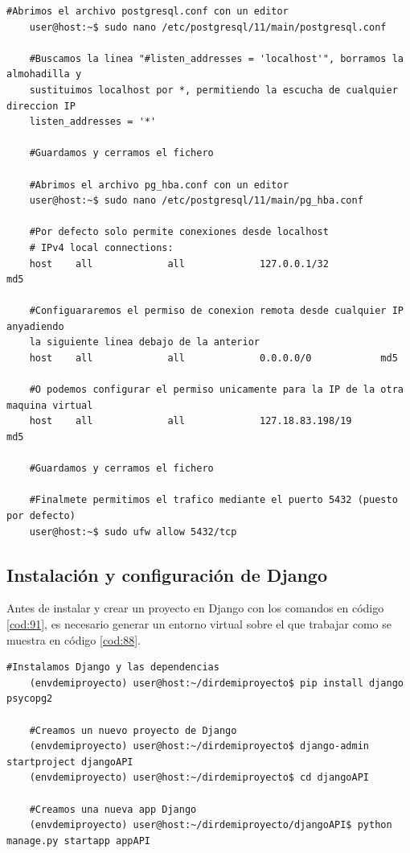 \begin{lstlisting}[caption={Instrucciones por consola y editor de texto para permitir la conexión remota en PostGreSQL}, label=cod:90]
	#Abrimos el archivo postgresql.conf con un editor
	user@host:~$ sudo nano /etc/postgresql/11/main/postgresql.conf
	
	#Buscamos la linea "#listen_addresses = 'localhost'", borramos la almohadilla y
	sustituimos localhost por *, permitiendo la escucha de cualquier direccion IP
	listen_addresses = '*'
	
	#Guardamos y cerramos el fichero
	
	#Abrimos el archivo pg_hba.conf con un editor
	user@host:~$ sudo nano /etc/postgresql/11/main/pg_hba.conf
	
	#Por defecto solo permite conexiones desde localhost
	# IPv4 local connections: 
	host    all             all             127.0.0.1/32            md5 
	
	#Configuararemos el permiso de conexion remota desde cualquier IP anyadiendo
	la siguiente linea debajo de la anterior
	host    all             all             0.0.0.0/0            md5 
	
	#O podemos configurar el permiso unicamente para la IP de la otra maquina virtual
	host    all             all             127.18.83.198/19            md5 
	
	#Guardamos y cerramos el fichero
	
	#Finalmete permitimos el trafico mediante el puerto 5432 (puesto por defecto)
	user@host:~$ sudo ufw allow 5432/tcp
\end{lstlisting}

\subsection{Instalación y configuración de Django}
Antes de instalar y crear un proyecto en Django con los comandos en código \ref{cod:91}, es necesario generar un entorno virtual sobre el que trabajar como se muestra en código \ref{cod:88}.

\begin{lstlisting}[caption={Instrucciones por consola de instalación y creación de un proyecto en Django}, label=cod:91]
	#Instalamos Django y las dependencias
	(envdemiproyecto) user@host:~/dirdemiproyecto$ pip install django psycopg2
	
	#Creamos un nuevo proyecto de Django
	(envdemiproyecto) user@host:~/dirdemiproyecto$ django-admin startproject djangoAPI
	(envdemiproyecto) user@host:~/dirdemiproyecto$ cd djangoAPI
	
	#Creamos una nueva app Django
	(envdemiproyecto) user@host:~/dirdemiproyecto/djangoAPI$ python manage.py startapp appAPI
\end{lstlisting}

